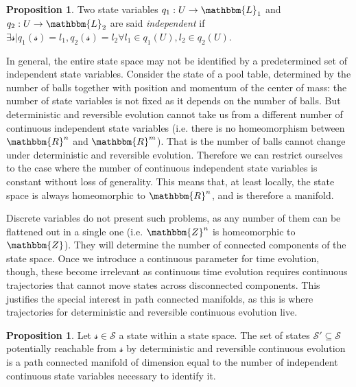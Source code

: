 \documentclass[aps,pra,10pt,twocolumn,floatfix,nofootinbib]{revtex4-1}
\numberwithin{equation}{section}
\theoremstyle{definition}
\newtheorem{prop}[equation]{Proposition}
\begin{document}
\begin{prop}\label{independent_state_variables}
	Two state variables $q_1 : U \rightarrow \mathbbm{L}_1$ and $q_2 : U \rightarrow \mathbbm{L}_2$ are said \emph{independent} if $\exists \mathcal{s} | q_1(\mathcal{s})=l_1, q_2(\mathcal{s})=l_2 \forall l_1 \in q_1(U), l_2 \in q_2(U)$.
\end{prop}

In general, the entire state space may not be identified by a predetermined set of independent state variables. Consider the state of a pool table, determined by the number of balls together with position and momentum of the center of mass: the number of state variables is not fixed as it depends on the number of balls. But deterministic and reversible evolution cannot take us from a different number of continuous independent state variables (i.e. there is no homeomorphism between $\mathbbm{R}^n$ and $\mathbbm{R}^m$). That is the number of balls cannot change under deterministic and reversible evolution. Therefore we can restrict ourselves to the case where the number of continuous independent state variables is constant without loss of generality. This means that, at least locally, the state space is always homeomorphic to $\mathbbm{R}^n$, and is therefore a manifold.

Discrete variables do not present such problems, as any number of them can be flattened out in a single one (i.e. $\mathbbm{Z}^n$ is homeomorphic to $\mathbbm{Z}$). They will determine the number of connected components of the state space. Once we introduce a continuous parameter for time evolution, though, these become irrelevant as continuous time evolution requires continuous trajectories that cannot move states across disconnected components. This justifies the special interest in path connected manifolds, as this is where trajectories for deterministic and reversible continuous evolution live.

\begin{prop}\label{continuous_state_space}
	Let $\mathcal{s} \in \mathcal{S}$ a state within a state space. The set of states $\mathcal{S}'\subseteq\mathcal{S}$ potentially reachable from $\mathcal{s}$ by deterministic and reversible continuous evolution is a path connected manifold of dimension equal to the number of independent continuous state variables necessary to identify it.
\end{prop}
\end{document}
